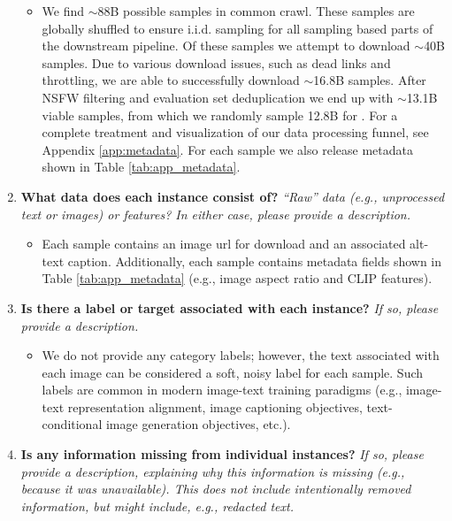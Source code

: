 \begin{enumerate}[label=Q\arabic*]
\begin{itemize}
\item We find $\sim$88B possible samples in common crawl. These samples are globally shuffled to ensure i.i.d. sampling for all sampling based parts of the downstream pipeline. Of these samples we attempt to download $\sim$40B samples. Due to various download issues, such as dead links and throttling, we are able to successfully download $\sim$16.8B samples. After NSFW filtering and evaluation set deduplication we end up with $\sim$13.1B viable samples, from which we randomly sample 12.8B for \pool. For a complete treatment and visualization of our data processing funnel, see Appendix \ref{app:metadata}. For each sample we also release metadata shown in Table \ref{tab:app_metadata}.
\end{itemize}

\item \textbf{What data does each instance consist of?} \textit{“Raw” data (e.g., unprocessed text or images) or features? In either case, please provide a description.}

\begin{itemize}
\item Each sample contains an image url for download and an associated alt-text caption. Additionally, each sample contains metadata fields shown in Table \ref{tab:app_metadata} (e.g., image aspect ratio and CLIP features).
\end{itemize}

\item \textbf{Is there a label or target associated with each instance?} \textit{If so, please provide a description.}

\begin{itemize}
\item We do not provide any category labels; however, the text associated with each image can be considered a soft, noisy label for each sample. Such labels are common in modern image-text training paradigms (e.g., image-text representation alignment, image captioning objectives, text-conditional image generation objectives, etc.).
\end{itemize}

\item \textbf{Is any information missing from individual instances?} \textit{If so, please provide a description, explaining why this information is missing (e.g., because it was unavailable). This does not include intentionally removed information, but might include, e.g., redacted text.}


\end{enumerate}
